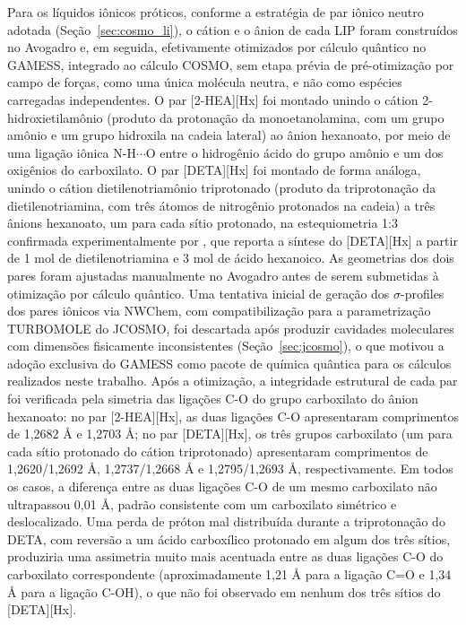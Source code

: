 Para os líquidos iônicos próticos, conforme a estratégia de par iônico neutro adotada (Seção~\ref{sec:cosmo_li}), o cátion e o ânion de cada LIP foram construídos no Avogadro e, em seguida, efetivamente otimizados por cálculo quântico no GAMESS, integrado ao cálculo COSMO, sem etapa prévia de pré-otimização por campo de forças, como uma única molécula neutra, e não como espécies carregadas independentes. O par [2-HEA][Hx] foi montado unindo o cátion 2-hidroxietilamônio (produto da protonação da monoetanolamina, com um grupo amônio  e um grupo hidroxila  na cadeia lateral) ao ânion hexanoato, por meio de uma ligação iônica N-H$\cdots$O entre o hidrogênio ácido do grupo amônio e um dos oxigênios do carboxilato. O par [DETA][Hx] foi montado de forma análoga, unindo o cátion dietilenotriamônio triprotonado (produto da triprotonação da dietilenotriamina, com três átomos de nitrogênio protonados na cadeia) a três ânions hexanoato, um para cada sítio protonado, na estequiometria 1:3 confirmada experimentalmente por , que reporta a síntese do [DETA][Hx] a partir de 1 mol de dietilenotriamina e 3 mol de ácido hexanoico. As geometrias dos dois pares foram ajustadas manualmente no Avogadro antes de serem submetidas à otimização por cálculo quântico. Uma tentativa inicial de geração dos $\sigma$-profiles dos pares iônicos via NWChem, com compatibilização para a parametrização TURBOMOLE do JCOSMO, foi descartada após produzir cavidades moleculares com dimensões fisicamente inconsistentes (Seção~\ref{sec:jcosmo}), o que motivou a adoção exclusiva do GAMESS como pacote de química quântica para os cálculos realizados neste trabalho. Após a otimização, a integridade estrutural de cada par foi verificada pela simetria das ligações C-O do grupo carboxilato do ânion hexanoato: no par [2-HEA][Hx], as duas ligações C-O apresentaram comprimentos de 1,2682 Å e 1,2703 Å; no par [DETA][Hx], os três grupos carboxilato (um para cada sítio protonado do cátion triprotonado) apresentaram comprimentos de 1,2620/1,2692 Å, 1,2737/1,2668 Å e 1,2795/1,2693 Å, respectivamente. Em todos os casos, a diferença entre as duas ligações C-O de um mesmo carboxilato não ultrapassou 0,01 Å, padrão consistente com um carboxilato simétrico e deslocalizado. Uma perda de próton mal distribuída durante a triprotonação do DETA, com reversão a um ácido carboxílico protonado em algum dos três sítios, produziria uma assimetria muito mais acentuada entre as duas ligações C-O do carboxilato correspondente (aproximadamente 1,21 Å para a ligação C=O e 1,34 Å para a ligação C-OH), o que não foi observado em nenhum dos três sítios do [DETA][Hx].


